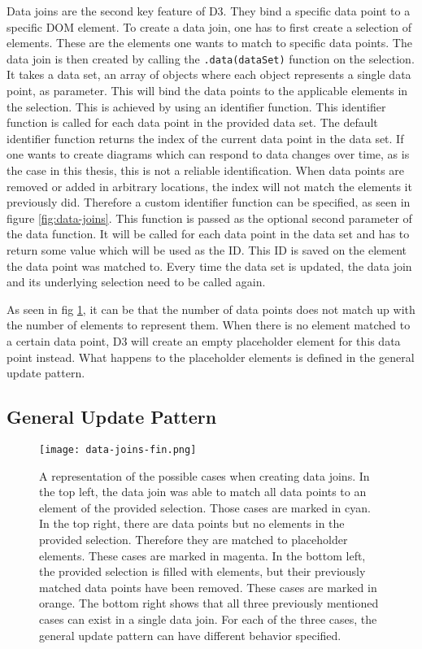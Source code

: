 Data joins are the second key feature of D3. They bind a specific data point to a specific DOM element. To create a data join, one has to first create a selection of elements. These are the elements one wants to match to specific data points. The data join is then created by calling the \texttt{.data(dataSet)} function on the selection. It takes a data set, an array of objects where each object represents a single data point, as parameter. This will bind the data points to the applicable elements in the selection. This is achieved by using an identifier function. This identifier function is called for each data point in the provided data set. The default identifier function returns the index of the current data point in the data set. If one wants to create diagrams which can respond to data changes over time, as is the case in this thesis, this is not a reliable identification. When data points are removed or added in arbitrary locations, the index will not match the elements it previously did. Therefore a custom identifier function can be specified, as seen in figure \ref{fig:data-joins}. This function is passed as the optional second parameter of the data function. It will be called for each data point in the data set and has to return some value which will be used as the ID. This ID is saved on the element the data point was matched to. Every time the data set is updated, the data join and its underlying selection need to be called again.

As seen in fig \ref{fig:general-update-pattern}, it can be that the number of data points does not match up with the number of elements to represent them. When there is no element matched to a certain data point, D3 will create an empty placeholder element for this data point instead. What happens to the placeholder elements is defined in the general update pattern.


\subsection{General Update Pattern}

\begin{figure}
    \texttt{[image: data-joins-fin.png]}
    \captionsetup{width=0.9\textwidth}
    \caption[general-update-pattern]{A representation of the possible cases when creating data joins. In the top left, the data join was able to match all data points to an element of the provided selection. Those cases are marked in cyan. In the top right, there are data points but no elements in the provided selection. Therefore they are matched to placeholder elements. These cases are marked in magenta. In the bottom left, the provided selection is filled with elements, but their previously matched data points have been removed. These cases are marked in orange. The bottom right shows that all three previously mentioned cases can exist in a single data join. For each of the three cases, the general update pattern can have different behavior specified.}
    \label{fig:general-update-pattern}
\end{figure}

